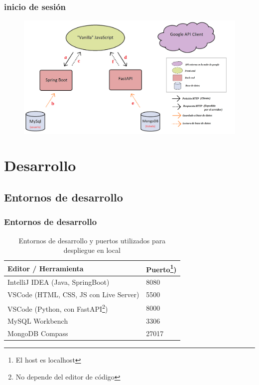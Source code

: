 \documentclass{beamer}
\begin{document}
			
			\begin{frame}
				\frametitle{inicio de sesión}
				
				\begin{figure}
					\centering
					\includegraphics[width=1\linewidth]{../img/diagramaSistemesAplicacioMercappCAMIINICISESSIO}
					
					\label{fig:diagramasistemesaplicaciomercappcamiinicisessio}
				\end{figure}
				
			\end{frame}
			
		
		
		
		
	\section{Desarrollo}
	
	
	
	
	
		

	
	
	
	\subsection{Entornos de desarrollo}
	\begin{frame}
		\frametitle{Entornos de desarrollo}
					
		\begin{table}[h!]
			\centering
			\begin{tabular}{|l|l|}
				\hline
				\textbf{Editor / Herramienta} & \textbf{Puerto\footnote{El host es localhost})} \\
				\hline
				IntelliJ IDEA (Java, SpringBoot) & 8080 \\
				VSCode (HTML, CSS, JS con Live Server) & 5500 \\
				VSCode (Python, con FastAPI\footnote{No depende del editor de código}) & 8000 \\
				MySQL Workbench & 3306 \\
				MongoDB Compass & 27017 \\
				\hline
			\end{tabular}
			\caption{Entornos de desarrollo y puertos utilizados para despliegue en local}
		\end{table}
	\end{frame}
	
\end{document}
